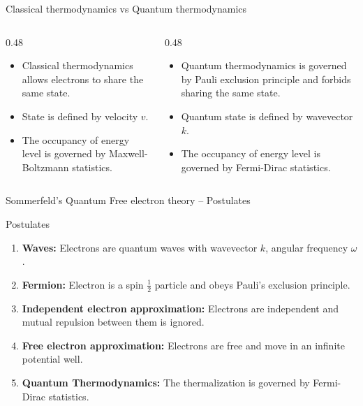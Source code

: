 \begin{frame}{Classical thermodynamics vs Quantum thermodynamics}
\begin{columns}[t]
		\begin{column}{0.48\textwidth}
			\begin{small}
				\begin{itemize}
					\item Classical thermodynamics allows electrons to share the same state.
					\item State is defined by velocity \(v\).
					\item The occupancy of energy level is governed by Maxwell-Boltzmann statistics.
				\end{itemize}
			\end{small}
		\end{column}
		\begin{column}{0.48\textwidth}
			\begin{small}
				\begin{itemize}
					\item Quantum thermodynamics is governed by Pauli exclusion principle and forbids sharing the same state.
					\item Quantum state is defined by wavevector \(k\).
					\item The occupancy of energy level is governed by Fermi-Dirac statistics.
				\end{itemize}
			\end{small}
		\end{column}
	\end{columns}
\end{frame}
%
\begin{frame}[label=pre-M2T1-slot1]{Sommerfeld's Quantum Free electron theory -- Postulates}
	\begin{block}{Postulates}
		\begin{enumerate}
			\item \textbf{Waves:} Electrons are quantum waves with wavevector \(k\), angular frequency \(\omega\).
			\item \textbf{Fermion:} Electron is a spin \(\tfrac{1}{2}\) particle and obeys Pauli's exclusion principle.
			\item \textbf{Independent electron approximation:} Electrons are independent and mutual repulsion between them is ignored.
			\item \textbf{Free electron approximation:} Electrons are free and move in an infinite potential well.
			\item \textbf{Quantum Thermodynamics:} The thermalization is governed by Fermi-Dirac statistics.

		\end{enumerate}
	\end{block}
\end{frame}
